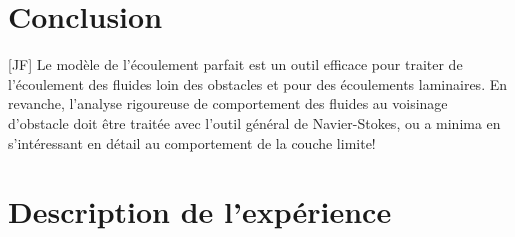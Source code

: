 \documentclass[11pt]{report}
\numberwithin{figure}{section}
\numberwithin{equation}{section}
\numberwithin{table}{section}
\newcommand{\1}{\boldsymbol{1}}
\begin{document}
\section*{Conclusion}
  
  
[JF] Le modèle de l'écoulement parfait est un outil efficace pour traiter de l'écoulement des fluides loin des obstacles et pour des écoulements laminaires. En revanche, l'analyse rigoureuse de comportement des fluides au voisinage d'obstacle doit être traitée avec l'outil général de Navier-Stokes, ou a minima en s'intéressant en détail au comportement de la couche limite!


\section*{Description de l'expérience}
\end{document}
